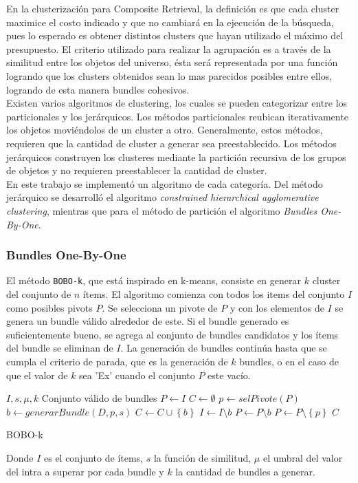En la clusterización para Composite Retrieval, la definición es que cada cluster maximice el costo indicado y que no cambiará en la ejecución de la búsqueda, pues lo esperado es obtener distintos clusters que hayan utilizado el máximo del presupuesto. El criterio utilizado para realizar la agrupación es a través de la similitud entre los objetos del universo, ésta será representada por una función logrando que los clusters obtenidos sean lo mas parecidos posibles entre ellos, logrando de esta manera bundles cohesivos.\\
Existen varios algoritmos de clustering, los cuales se pueden categorizar entre los particionales y los jerárquicos. Los métodos particionales reubican iterativamente los objetos moviéndolos de un cluster a otro. Generalmente, estos métodos, requieren que la cantidad de cluster a generar sea preestablecido. Los métodos jerárquicos construyen los clusteres mediante la partición recursiva de los grupos de objetos y no requieren preestablecer la cantidad de cluster.\\
En este trabajo se implementó un algoritmo de cada categoría. Del método jerárquico se desarrolló el algoritmo \textit{constrained hierarchical agglomerative clustering}, mientras que para el método de partición el algoritmo \textit{Bundles One-By-One}.\\

\subsubsection{Bundles One-By-One}
El método \texttt{BOBO-k}, que está inspirado en k-means, consiste en generar $k$ cluster del conjunto de $n$ ítems. El algoritmo comienza con todos los items del conjunto $I$ como posibles pivots $P$. Se selecciona un pivote de $P$ y con los elementos de $I$ se genera un bundle válido alrededor de este. Si el bundle generado es suficientemente bueno, se agrega al conjunto de bundles candidatos y los ítems del bundle se eliminan de $I$. La generación de bundles continúa hasta que se cumpla el criterio de parada, que es la generación de $k$ bundles, o en el caso de que el valor de $k$ sea 'Ex' cuando el conjunto $P$ este vacío.

\begin{algorithm}[H]
\begin{algorithmic}[1]
\REQUIRE $I, s, \mu, k $
\ENSURE Conjunto válido de bundles
\STATE $P \leftarrow I$
\STATE $C \leftarrow \emptyset$
\STATE $p \leftarrow selPivote(P)$
\STATE $b \leftarrow generarBundle(D, p, s)$
\STATE $C \leftarrow C \cup \left\{b\right\}$
\STATE $I \leftarrow I \setminus b$
\STATE $P \leftarrow P \setminus b$
\ELSE
\STATE $P \leftarrow P \setminus \left\{p\right\}$
\ENDIF
\ENDWHILE
\RETURN $C$
\end{algorithmic}
\caption{BOBO-k}\label{alg:bobo}
\end{algorithm}
Donde $I$ es el conjunto de ítems, $s$ la función de similitud, $\mu$ el umbral del valor del intra a superar por cada bundle y $k$ la cantidad de bundles a generar.

